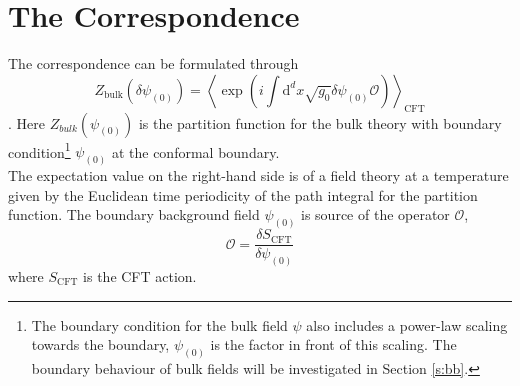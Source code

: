 \documentclass[12pt]{report}
\renewcommand{\d}{\ensuremath{\mathrm{d}}}
\renewcommand{\i}{\ensuremath{i}}
\begin{document}

\section{The Correspondence\label{correspondence}}
The correspondence can be formulated through
\begin{equation}
 Z_{\mathrm{bulk}}(\delta\psi_{(0)})=\left\langle\exp(\i\int\d^dx\sqrt{g_0}\delta\psi_{(0)}\mathcal{O})\right\rangle_{\mathrm{CFT}}\label{fulCorr}
\end{equation}
 \cite{hartnoll8}. Here $Z_{bulk}(\psi_{(0)})$ is the partition function for the bulk theory with boundary condition\footnote{The boundary condition for the bulk field $\psi$ also includes a power-law scaling towards the boundary, $\psi_{(0)}$ is the factor in front of this scaling. The boundary behaviour of bulk fields will be investigated in Section \ref{s:bb}.} $\psi_{(0)}$ at the conformal boundary.\\

The expectation value on the right-hand side is of a field theory at a temperature given by the Euclidean time periodicity of the path integral for the partition function. The boundary background field $\psi_{(0)}$ is source of the operator $\mathcal{O}$,
\begin{equation}
\mathcal{O}= \frac{\delta S_{\mathrm{CFT}}}{\delta \psi_{(0)}}
\end{equation}
 where $S_{\mathrm{CFT}}$ is the CFT action.\\%
\end{document}
